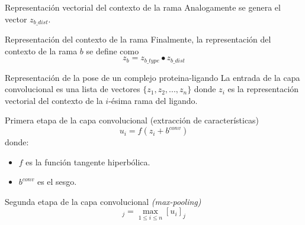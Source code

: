 \documentclass[presentation]{beamer}
\begin{document}
\begin{frame}[label={sec:org6e1ad69}]{Representación vectorial del contexto de la rama}
Analogamente se genera el vector \(z_{b\_dist}\).
\pause
\begin{block}{Representación del contexto de la rama}
Finalmente, la representación del contexto de la rama \(b\) se define como
\begin{equation*}
z_b = z_{b\_type} \bullet z_{b\_dist}
\end{equation*}
\end{block}
\end{frame}

\begin{frame}[label={sec:org7456708}]{Representación de la pose de un complejo proteina-ligando}
La entrada de la capa convolucional es una lista de vectores
\(\{z_1, z_2, ..., z_n\}\) donde \(z_i\) es la representación vectorial
del contexto de la \(i\)-ésima rama del ligando.
\pause
\begin{block}{Primera etapa de la capa convolucional (extracción de características)}
\begin{equation*}
  u_i = f(z_i + b^{conv})
\end{equation*}
donde:
\begin{itemize}
\item \(f\) es la función tangente hiperbólica.
\item \(b^{conv}\) es el sesgo.
\end{itemize}
\pause
\end{block}
\begin{block}{Segunda etapa de la capa convolucional \emph{(max-pooling)}}
\begin{equation*}
  [r]_j = \max_{1 \leq i \leq n} [u_i]_j
\end{equation*}
\end{block}
\end{frame}
\end{document}
